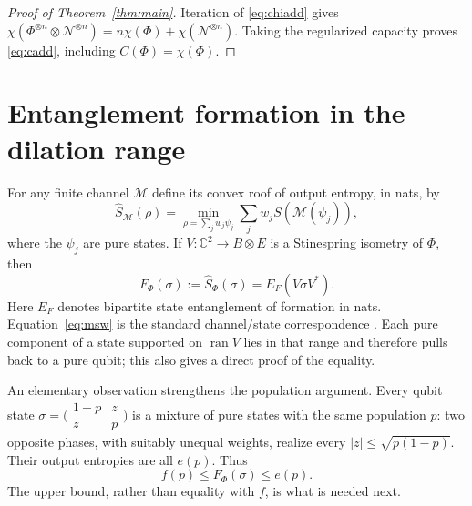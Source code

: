\documentclass[11pt]{article}
\begin{document}
\begin{proof}[Proof of Theorem~\ref{thm:main}]
Iteration of \eqref{eq:chiadd} gives
$\chi(\Phi^{\otimes n}\otimes\mathcal N^{\otimes n})
=n\chi(\Phi)+\chi(\mathcal N^{\otimes n})$.
Taking the regularized capacity proves \eqref{eq:cadd}, including $C(\Phi)=\chi(\Phi)$.
\end{proof}


\section{Entanglement formation in the dilation range}\label{sec:formation}\label{sec:roof}
For any finite channel $\mathcal M$ define its convex roof of output entropy,
in nats, by
\[
 \widehat S_{\mathcal M}(\rho)=
 \min_{\rho=\sum_jw_j\psi_j}\sum_jw_j S(\mathcal M(\psi_j)),
\]
where the $\psi_j$ are pure states. If $V:\mathbb C^2\to B\otimes E$
is a Stinespring isometry of $\Phi$, then
\begin{equation}\label{eq:msw}
 F_\Phi(\sigma):=\widehat S_\Phi(\sigma)
       =E_F(V\sigma V^*) .
\end{equation}
Here $E_F$ denotes bipartite state entanglement of formation in nats.
Equation~\eqref{eq:msw} is the standard channel/state correspondence
\cite{msw}. Each pure component of a state supported on $\operatorname{ran}V$
lies in that range and therefore pulls back to a pure qubit; this also gives
a direct proof of the equality.

An elementary observation strengthens the population argument. Every
qubit state $\sigma=\bigl(\begin{smallmatrix}1-p&z\\\bar z&p\end{smallmatrix}\bigr)$
is a mixture of pure states with the same population $p$: two opposite
phases, with suitably unequal weights, realize every $|z|\le\sqrt{p(1-p)}$.
Their output entropies are all $e(p)$. Thus
\begin{equation}\label{eq:roofupper}
 f(p)\le F_\Phi(\sigma)\le e(p).
\end{equation}
The upper bound, rather than equality with $f$, is what is needed next.
\end{document}
